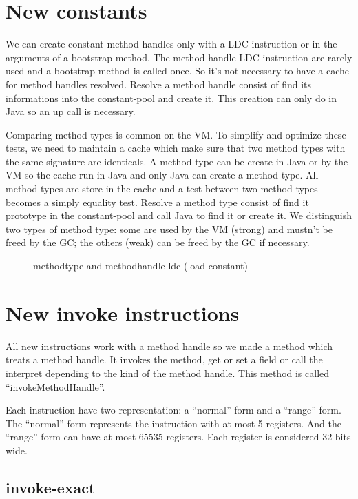 \documentclass{sigplanconf}
\begin{document}
\section{New constants}

  We can create constant method handles only with a LDC instruction or in the arguments of a bootstrap method.
  The method handle LDC instruction are rarely used and a bootstrap method is called once.
  So it's not necessary to have a cache for method handles resolved.
  Resolve a method handle consist of find its informations into the constant-pool and create it.
  This creation can only do in Java so an up call is necessary.

  Comparing method types is common on the VM.
  To simplify and optimize these tests, we need to maintain a cache which make sure that two method types with the same signature are identicals.
  A method type can be create in Java or by the VM so the cache run in Java and only Java can create a method type.
  All method types are store in the cache and a test between two method types becomes a simply equality test.
  Resolve a method type consist of find it prototype in the constant-pool and call Java to find it or create it.
  We distinguish two types of method type: some are used by the VM (strong) and mustn't be freed by the GC; the others (weak) can be freed by the GC if necessary.

  \begin{figure}[!h]
    \centering 
    \caption{methodtype and methodhandle ldc (load constant)}
    \label{MTMHldc}
  \end{figure}

\section{New invoke instructions}
  All new instructions work with a method handle so we made a method which treats a method handle.
  It invokes the method, get or set a field or call the interpret depending to the kind of the method handle.
  This method is called ``invokeMethodHandle''.
  
  Each instruction have two representation: a ``normal'' form and a ``range'' form.
  The ``normal'' form represents the instruction with at most 5 registers.
  And the ``range'' form can have at most 65535 registers.
  Each register is considered 32 bits wide.

  \subsection{invoke-exact}
\end{document}
